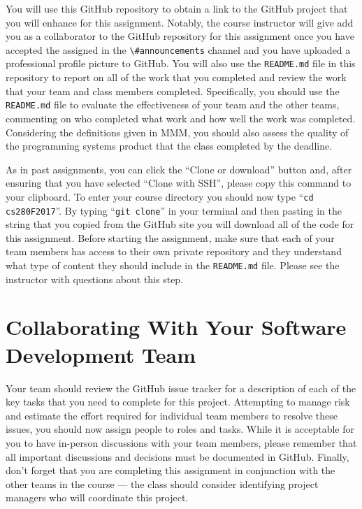 \documentclass[11pt]{article}
\newcommand{\reflection}{\lstinline{README.md}}
\newcommand{\command}[1]{``\lstinline{#1}''}
\newcommand{\channel}[1]{\lstinline{#1}}
\begin{document}
You will use this GitHub repository to obtain a link to the GitHub project that you will enhance for this assignment.
Notably, the course instructor will give add you as a collaborator to the GitHub repository for this assignment once you
have accepted the assigned in the \channel{\#announcements} channel and you have uploaded a professional profile picture
to GitHub. You will also use the \reflection{} file in this repository to report on all of the work that you completed
and review the work that your team and class members completed. Specifically, you should use the \reflection{} file to
evaluate the effectiveness of your team and the other teams, commenting on who completed what work and how well the work
was completed. Considering the definitions given in MMM, you should also assess the quality of the programming systems
product that the class completed by the deadline.

As in past assignments, you can click the ``Clone or download'' button and, after ensuring that you have selected
``Clone with SSH'', please copy this command to your clipboard. To enter your course directory you should now type
\command{cd cs280F2017}. By typing \command{git clone} in your terminal and then pasting in the string that you copied
from the GitHub site you will download all of the code for this assignment. Before starting the assignment, make sure
that each of your team members has access to their own private repository and they understand what type of content they
should include in the \reflection{} file. Please see the instructor with questions about this step.

\section*{Collaborating With Your Software Development Team}

Your team should review the GitHub issue tracker for a description of each of the key tasks that you need to complete
for this project. Attempting to manage risk and estimate the effort required for individual team members to resolve
these issues, you should now assign people to roles and tasks. While it is acceptable for you to have in-person
discussions with your team members, please remember that all important discussions and decisions must be documented in
GitHub. Finally, don't forget that you are completing this assignment in conjunction with the other teams in the course
--- the class should consider identifying project managers who will coordinate this project.
\end{document}
